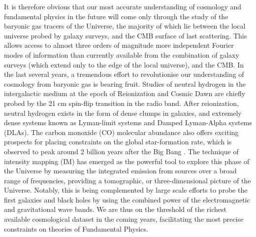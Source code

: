 It is therefore obvious that our most accurate understanding of cosmology and fundamental physics in the future will come only through the study of the baryonic gas tracers of the Universe, the majority of which lie between the local universe probed by galaxy surveys, and the CMB surface of last scattering. This allows access to almost three orders of magnitude more independent Fourier modes of information than currently available from the combination of galaxy surveys (which extend only to the edge of the local universe), and the CMB.  In the last several years, a tremendous effort to revolutionise our understanding of cosmology from baryonic gas is bearing fruit. Studies of neutral hydrogen in the intergalactic medium at the epoch of Reionization and Cosmic Dawn are chiefly probed by the 21 cm spin-flip transition in the radio band. After reionization, neutral hydrogen exists in the form of dense clumps in galaxies, and extremely dense systems known as Lyman-limit systems and Damped Lyman-Alpha systems (DLAs). The carbon monoxide (CO) molecular abundance also offers exciting prospects for placing constraints on the global star-formation rate, which is observed to peak around 2 billion years after the Big Bang \cite{lilly1996, madau1998}. The technique of intensity mapping (IM) has emerged as the powerful tool to explore this phase of the Universe by measuring the integrated emission from sources over a broad range of frequencies, providing a tomographic, or three-dimensional picture of the Universe. Notably, this is being complemented by large scale efforts to probe the first galaxies and black holes by using the combined power of the electromagnetic and gravitational wave bands. We are thus on the threshold of the richest available cosmological dataset in the coming years, facilitating the most precise constraints on theories of Fundamental Physics. 

